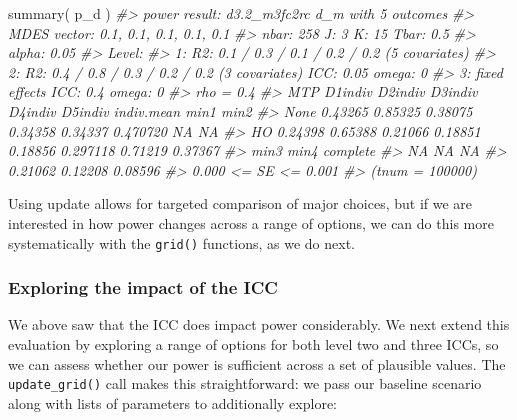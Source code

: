 \documentclass{article}
\newenvironment{Shaded}{\begin{snugshade}}{\end{snugshade}}
\newcommand{\CommentTok}[1]{\textcolor[rgb]{0.56,0.35,0.01}{\textit{#1}}}
\newcommand{\FunctionTok}[1]{\textcolor[rgb]{0.00,0.00,0.00}{#1}}
\newcommand{\NormalTok}[1]{#1}
\begin{document}
\begin{Shaded}
\begin{Highlighting}[]
\FunctionTok{summary}\NormalTok{( p\_d )}
\CommentTok{\#\textgreater{} power result: d3.2\_m3fc2rc d\_m with 5 outcomes}
\CommentTok{\#\textgreater{}   MDES vector: 0.1, 0.1, 0.1, 0.1, 0.1}
\CommentTok{\#\textgreater{}   nbar: 258  J: 3    K: 15   Tbar: 0.5}
\CommentTok{\#\textgreater{}   alpha: 0.05    }
\CommentTok{\#\textgreater{}   Level:}
\CommentTok{\#\textgreater{}     1: R2: 0.1 / 0.3 / 0.1 / 0.2 / 0.2 (5 covariates)}
\CommentTok{\#\textgreater{}     2: R2: 0.4 / 0.8 / 0.3 / 0.2 / 0.2 (3 covariates)    ICC: 0.05   omega: 0}
\CommentTok{\#\textgreater{}     3:   fixed effects   ICC: 0.4    omega: 0}
\CommentTok{\#\textgreater{}   rho = 0.4}
\CommentTok{\#\textgreater{}   MTP D1indiv D2indiv D3indiv D4indiv D5indiv indiv.mean    min1    min2}
\CommentTok{\#\textgreater{}  None 0.43265 0.85325 0.38075 0.34358 0.34337   0.470720      NA      NA}
\CommentTok{\#\textgreater{}    HO 0.24398 0.65388 0.21066 0.18851 0.18856   0.297118 0.71219 0.37367}
\CommentTok{\#\textgreater{}     min3    min4 complete}
\CommentTok{\#\textgreater{}       NA      NA       NA}
\CommentTok{\#\textgreater{}  0.21062 0.12208  0.08596}
\CommentTok{\#\textgreater{}  0.000 \textless{}= SE \textless{}= 0.001}
\CommentTok{\#\textgreater{}  (tnum = 100000)}
\end{Highlighting}
\end{Shaded}

Using update allows for targeted comparison of major choices, but if we
are interested in how power changes across a range of options, we can do
this more systematically with the \texttt{grid()} functions, as we do
next.

\subsubsection{Exploring the impact of the ICC}

We above saw that the ICC does impact power considerably. We next extend
this evaluation by exploring a range of options for both level two and
three ICCs, so we can assess whether our power is sufficient across a
set of plausible values. The \texttt{update\_grid()} call makes this
straightforward: we pass our baseline scenario along with lists of
parameters to additionally explore:
\end{document}

